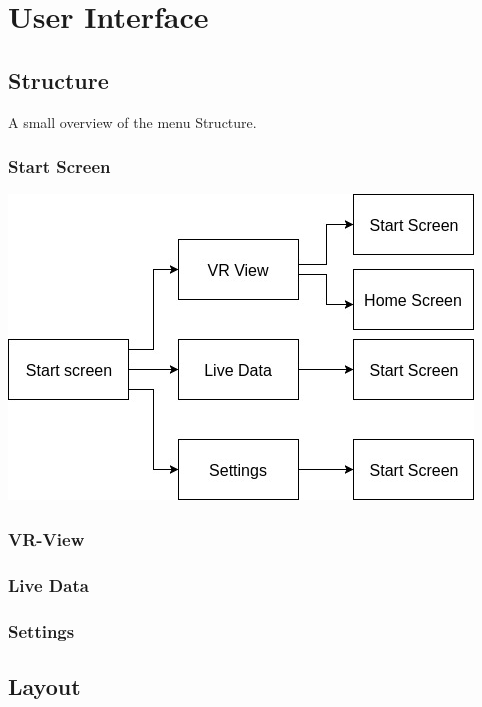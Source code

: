 \section{User Interface}


\subsection{Structure}

A small overview of the menu Structure.

\subsubsection{Start Screen}

\includegraphics[scale=0.5]{pics/startscreen.jpg}

\subsubsection{VR-View}



\subsubsection{Live Data}


\subsubsection{Settings}


\subsection{Layout}

